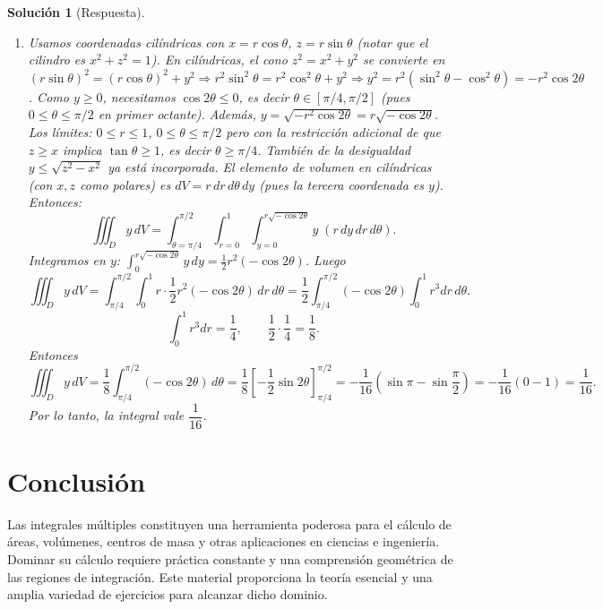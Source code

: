 \documentclass[12pt,spanish]{article}
\newtheorem{solucion}{Solución}
\begin{document}
\begin{solucion}[Respuesta]
\begin{enumerate}[label=\alph*)]
\item Usamos coordenadas cilíndricas con $x=r\cos\theta$, $z=r\sin\theta$ (notar que el cilindro es $x^2+z^2=1$). En cilíndricas, el cono $z^2=x^2+y^2$ se convierte en $(r\sin\theta)^2 = (r\cos\theta)^2 + y^2 \Rightarrow r^2\sin^2\theta = r^2\cos^2\theta + y^2 \Rightarrow y^2 = r^2(\sin^2\theta-\cos^2\theta) = -r^2\cos2\theta$. Como $y\ge0$, necesitamos $\cos2\theta\le0$, es decir $\theta\in[\pi/4,\pi/2]$ (pues $0\le\theta\le\pi/2$ en primer octante). Además, $y = \sqrt{-r^2\cos2\theta} = r\sqrt{-\cos2\theta}$. Los límites: $0\le r\le1$, $0\le\theta\le\pi/2$ pero con la restricción adicional de que $z\ge x$ implica $\tan\theta\ge1$, es decir $\theta\ge\pi/4$. También de la desigualdad $y\le\sqrt{z^2-x^2}$ ya está incorporada. El elemento de volumen en cilíndricas (con $x,z$ como polares) es $dV = r\,dr\,d\theta\,dy$ (pues la tercera coordenada es $y$). Entonces:
\[
\iiint_D y\,dV = \int_{\theta=\pi/4}^{\pi/2} \int_{r=0}^{1} \int_{y=0}^{r\sqrt{-\cos2\theta}} y\; (r\,dy\,dr\,d\theta).
\]
Integramos en $y$: $\int_0^{r\sqrt{-\cos2\theta}} y\,dy = \frac12 r^2(-\cos2\theta)$. Luego
\[
\iiint_D y\,dV = \int_{\pi/4}^{\pi/2} \int_0^1 r\cdot \frac12 r^2(-\cos2\theta)\,dr\,d\theta = \frac12 \int_{\pi/4}^{\pi/2} (-\cos2\theta) \int_0^1 r^3 dr\,d\theta.
\]
\[
\int_0^1 r^3 dr = \frac14, \qquad \frac12\cdot\frac14=\frac18.
\]
Entonces
\[
\iiint_D y\,dV = \frac18 \int_{\pi/4}^{\pi/2} (-\cos2\theta)\,d\theta = \frac18 \left[ -\frac12\sin2\theta \right]_{\pi/4}^{\pi/2} = -\frac1{16}\left( \sin\pi - \sin\frac{\pi}{2}\right) = -\frac1{16}(0-1)=\frac1{16}.
\]
Por lo tanto, la integral vale $\boxed{\dfrac{1}{16}}$.
\end{enumerate}
\end{solucion}

\section*{Conclusión}
Las integrales múltiples constituyen una herramienta poderosa para el cálculo de áreas, volúmenes, centros de masa y otras aplicaciones en ciencias e ingeniería. Dominar su cálculo requiere práctica constante y una comprensión geométrica de las regiones de integración. Este material proporciona la teoría esencial y una amplia variedad de ejercicios para alcanzar dicho dominio.
\end{document}
